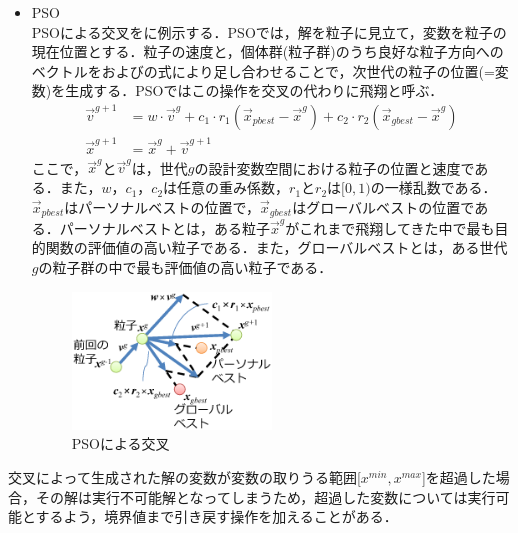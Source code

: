 \begin{itemize}
    \item PSO\cite{Kennedy95}\\
          PSOによる交叉をに例示する．PSOでは，解を粒子に見立て，変数を粒子の現在位置とする．粒子の速度と，個体群(粒子群)のうち良好な粒子方向へのベクトルをおよびの式により足し合わせることで，次世代の粒子の位置(=変数)を生成する．PSOではこの操作を交叉の代わりに飛翔と呼ぶ．
          \begin{align}
              \vec{v}^{g+1} & = w\cdot \vec{v}^g + c_1 \cdot r_1 (\vec{x}_{pbest}-\vec{x}^g) + c_2 \cdot r_2 (\vec{x}_{gbest} - \vec{x}^g)
              \label{eq::theory_pso_velocity}
              \\
              \vec{x}^{g+1} & = \vec{x}^g + \vec{v}^{g+1}
              \label{eq::theory_pso_position}
          \end{align}
          ここで，$\vec{x}^g$と$\vec{v}^g$は，世代$g$の設計変数空間における粒子の位置と速度である．また，$w$，$c_1$，$c_2$は任意の重み係数，$r_1$と$r_2$は$[0, 1)$の一様乱数である．$\vec{x}_{pbest}$はパーソナルベストの位置で，$\vec{x}_{gbest}$はグローバルベストの位置である．パーソナルベストとは，ある粒子$\vec{x}^g$がこれまで飛翔してきた中で最も目的関数の評価値の高い粒子である．また，グローバルベストとは，ある世代$g$の粒子群の中で最も評価値の高い粒子である．
          \begin{figure}[ht]
              \begin{center}
                  \includegraphics[width=0.5\textwidth,keepaspectratio=true]{fig/theory_pso.eps}
              \end{center}
              \caption{PSOによる交叉}
              \label{fig::theory_pso}
          \end{figure}

\end{itemize}

交叉によって生成された解の変数が変数の取りうる範囲[$x^{min}, x^{max}$]を超過した場合，その解は実行不可能解となってしまうため，超過した変数については実行可能とするよう，境界値まで引き戻す操作を加えることがある．

